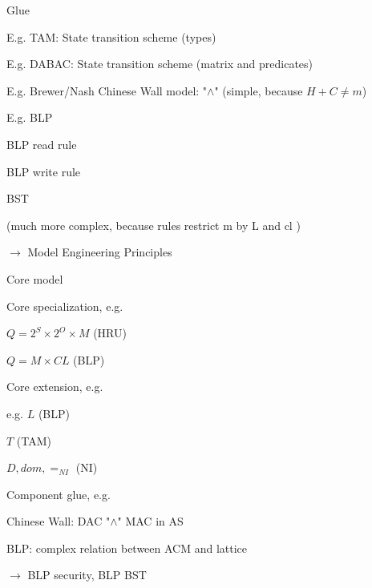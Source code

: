 \documentclass[a4paper]{article}
\begin{document}
\begin{multicols}{3}
    Glue
    \begin{itemize*}
        \item E.g. TAM: State transition scheme (types)
        \item E.g. DABAC: State transition scheme (matrix and predicates)
        \item E.g. Brewer/Nash Chinese Wall model: "$\wedge$" (simple, because $H+C\not= m$)
        \item E.g. BLP
              \begin{itemize*}
                  \item BLP read rule
                  \item BLP write rule
                  \item BST
                  \item (much more complex, because rules restrict m by L and cl )
              \end{itemize*}
    \end{itemize*}

    $\rightarrow$  Model Engineering Principles
    \begin{itemize*}
        \item  Core model
        \item  Core specialization, e.g.
              \begin{itemize*}
                  \item $Q = 2^S\times 2^O \times M$ (HRU)
                  \item $Q = M\times CL$ (BLP)
              \end{itemize*}
        \item Core extension, e.g.
              \begin{itemize*}
                  \item e.g. $L$ (BLP)
                  \item $T$ (TAM)
                  \item $D, dom ,=_{NI}$ (NI)
              \end{itemize*}
        \item Component glue, e.g.
              \begin{itemize*}
                  \item Chinese Wall: DAC "$\wedge$" MAC in AS
                  \item BLP: complex relation between ACM and lattice
                  \item $\rightarrow$  BLP security, BLP BST
              \end{itemize*}
    \end{itemize*}


\end{multicols}
\end{document}
